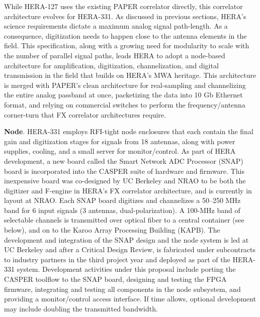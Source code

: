\documentclass[ars]{/Users/daviddeboer1/Documents/Papers/Copernicus_LaTeX_Package_v_2_7/copernicus}
\begin{document}
While HERA-127 uses the existing PAPER correlator directly, this correlator architecture evolves for
HERA-331.  As discussed in previous sections,
HERA's science requirements dictate a maximum analog signal path-length.  As a consequence,
digitization needs to happen close to the antenna
elements in the field.  This specification, along with a growing need for modularity to scale with the number of parallel signal paths,
leads HERA to adopt a node-based architecture for amplification, digitization, channelization, and digital
transmission in the field that builds on HERA's MWA heritage.  This architecture is merged with PAPER's clean 
architecture for real-sampling and channelizing the entire analog passband at once, packetizing the data into
10 Gb Ethernet format, and relying on commercial switches to perform the frequency/antenna corner-turn that
FX correlator architectures require. 



{\bf Node}. HERA-331 employs RFI-tight node enclosures that each contain the final gain and digitization stages for
signals from 18 antennas, along with power supplies, cooling, and a small server for monitor/control.  
As part of HERA development,
a new board called the Smart Network ADC Processor (SNAP) board is incorporated 
into the CASPER suite of hardware and firmware. This inexpensive board was co-designed by UC Berkeley and NRAO to be
both the digitizer and F-engine in HERA's FX correlator architecture,
and is currently in layout at NRAO.  Each SNAP board 
digitizes and channelizes a 50--250 MHz band for 6 input signals (3 antennas, dual-polarization).
A 100-MHz band of selectable channels is transmitted over optical fiber
to a central container (see below), and on to the Karoo Array Processing Building (KAPB).  The development and integration of the SNAP
design and the node system is led at UC Berkeley and after a Critical Design Review, is fabricated
under subcontracts to industry partners in the third project year and deployed as part of the HERA-331 system.
Development activities under this proposal include porting the CASPER toolflow to
the SNAP board, designing and testing the FPGA firmware,
integrating and testing all components in the node subsystem, and providing a monitor/control
access interface.  If time allows, optional development may include doubling the transmitted bandwidth.
\end{document}
